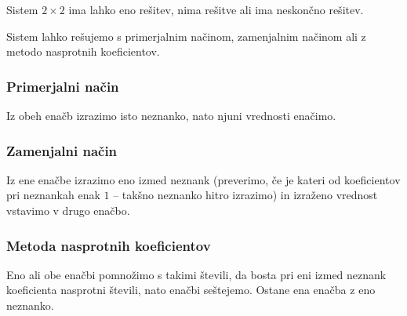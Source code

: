             
                    Sistem $2\times 2$ ima lahko eno rešitev, nima rešitve ali ima neskončno rešitev.
            

        

        
            
                Sistem lahko rešujemo s primerjalnim načinom, zamenjalnim načinom ali z metodo nasprotnih koeficientov.
            
        
            \subsubsection*{Primerjalni način}
                Iz obeh enačb izrazimo isto neznanko, nato njuni vrednosti enačimo.
            

            \subsubsection*{Zamenjalni način}
                Iz ene enačbe izrazimo eno izmed neznank (preverimo, če je kateri od koeficientov pri neznankah enak $1$ -- takšno neznanko hitro izrazimo) in izraženo vrednost vstavimo v drugo enačbo.
            

            \subsubsection*{Metoda nasprotnih koeficientov}
                Eno ali obe enačbi pomnožimo s takimi števili, da bosta pri eni izmed neznank koeficienta nasprotni števili, nato enačbi seštejemo.
                Ostane ena enačba z eno neznanko.
            

~~\\~~
        



